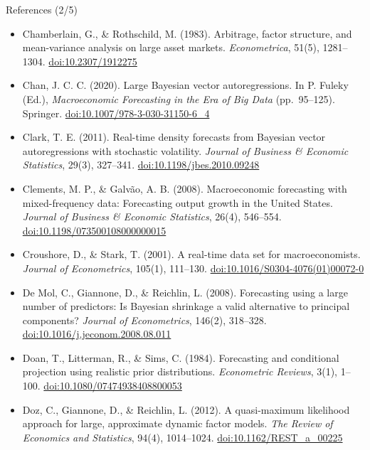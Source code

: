 \begin{frame}{References (2/5)}
\itemsize{\tiny}
\begin{itemize}
    \item Chamberlain, G., \& Rothschild, M. (1983). Arbitrage, factor structure, and mean-variance analysis on large asset markets. \textit{Econometrica}, 51(5), 1281--1304. \href{https://doi.org/10.2307/1912275}{doi:10.2307/1912275}
    \item Chan, J. C. C. (2020). Large Bayesian vector autoregressions. In P. Fuleky (Ed.), \textit{Macroeconomic Forecasting in the Era of Big Data} (pp.\ 95--125). Springer. \href{https://doi.org/10.1007/978-3-030-31150-6_4}{doi:10.1007/978-3-030-31150-6\_4}
    \item Clark, T. E. (2011). Real-time density forecasts from Bayesian vector autoregressions with stochastic volatility. \textit{Journal of Business \& Economic Statistics}, 29(3), 327--341. \href{https://doi.org/10.1198/jbes.2010.09248}{doi:10.1198/jbes.2010.09248}
    \item Clements, M. P., \& Galvão, A. B. (2008). Macroeconomic forecasting with mixed-frequency data: Forecasting output growth in the United States. \textit{Journal of Business \& Economic Statistics}, 26(4), 546--554. \href{https://doi.org/10.1198/073500108000000015}{doi:10.1198/073500108000000015}
    \item Croushore, D., \& Stark, T. (2001). A real-time data set for macroeconomists. \textit{Journal of Econometrics}, 105(1), 111--130. \href{https://doi.org/10.1016/S0304-4076(01)00072-0}{doi:10.1016/S0304-4076(01)00072-0}
    \item De Mol, C., Giannone, D., \& Reichlin, L. (2008). Forecasting using a large number of predictors: Is Bayesian shrinkage a valid alternative to principal components? \textit{Journal of Econometrics}, 146(2), 318--328. \href{https://doi.org/10.1016/j.jeconom.2008.08.011}{doi:10.1016/j.jeconom.2008.08.011}
    \item Doan, T., Litterman, R., \& Sims, C. (1984). Forecasting and conditional projection using realistic prior distributions. \textit{Econometric Reviews}, 3(1), 1--100. \href{https://doi.org/10.1080/07474938408800053}{doi:10.1080/07474938408800053}
    \item Doz, C., Giannone, D., \& Reichlin, L. (2012). A quasi-maximum likelihood approach for large, approximate dynamic factor models. \textit{The Review of Economics and Statistics}, 94(4), 1014--1024. \href{https://doi.org/10.1162/REST_a_00225}{doi:10.1162/REST\_a\_00225}

\end{itemize}
\end{frame}
